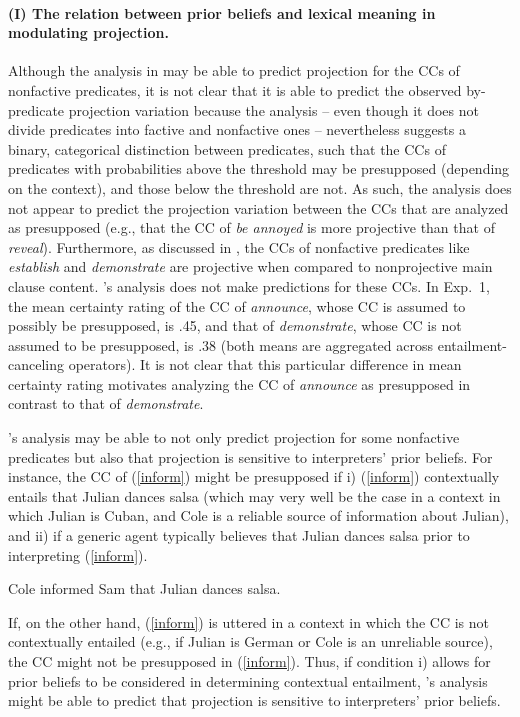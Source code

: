 \documentclass[11pt,fleqn]{article}
\newcommand{\6}{\mbox{$[\hspace*{-.6mm}[$}}
\newcommand{\9}{\mbox{$]\hspace*{-.6mm}]$}}
\newcommand{\citepos}[1]{\citeauthor{#1}'s \citeyear{#1}}
\begin{document}
\paragraph{(I) The relation between prior beliefs and lexical meaning in modulating projection.} Although the analysis in \citealt{schlenker2021}  may be able to predict projection for the CCs of nonfactive predicates, it is not clear that it is able to predict the observed by-predicate projection variation because the analysis -- even  though it does not divide predicates into factive and nonfactive ones -- nevertheless suggests a binary, categorical distinction between predicates, such that the CCs of predicates with probabilities above the threshold may be presupposed (depending on the context), and those below the threshold are not. As such, the analysis does not appear to predict the projection variation between the CCs that are analyzed as presupposed (e.g., that the CC of {\em be annoyed} is more projective than that of {\em reveal}). Furthermore, as discussed in \citealt{degen-tonhauser-language}, the CCs of nonfactive predicates like \emph{establish} and \emph{demonstrate} are projective when compared to nonprojective main clause content. \citepos{schlenker2021} analysis does not make predictions for these CCs. In Exp.~1, the mean certainty rating of the CC of \emph{announce}, whose CC is assumed to possibly be presupposed, is .45, and that of {\em demonstrate}, whose CC is not assumed to be presupposed, is .38 (both means are aggregated across entailment-canceling operators). It is not clear that this particular difference in mean certainty rating motivates analyzing the CC of \emph{announce} as presupposed in contrast to that of \emph{demonstrate}.

\citepos{schlenker2021} analysis may be able to not only predict projection for some nonfactive predicates but also that projection is sensitive to interpreters' prior beliefs. For instance, the CC of (\ref{inform}) might be presupposed if  i) (\ref{inform}) contextually entails that Julian dances salsa (which may very well be the case in a context in which Julian is Cuban, and Cole is a reliable source of information about Julian), and ii) if a generic agent typically believes that Julian dances salsa prior to interpreting (\ref{inform}). 

\begin{exe}
\ex\label{inform} Cole informed Sam that Julian dances salsa.
\end{exe}
If, on the other hand, (\ref{inform}) is uttered in a context in which the CC is not contextually entailed (e.g., if Julian is German or Cole is an unreliable source), the CC might not be presupposed in (\ref{inform}). Thus, if condition i) allows for prior beliefs to be considered in determining contextual entailment, \citepos{schlenker2021} analysis might be able to predict that projection is sensitive to interpreters' prior beliefs. 
\end{document}
